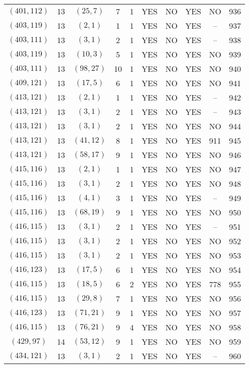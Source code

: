 \begin{longtable}{|c|c|c|c|c|c|c|c|c|c|}
$(401, 112)$ & 13 & $(25, 7)$ & 7 & 1 & YES & NO & YES & NO & 936\\
$(403, 119)$ & 13 & $(2, 1)$ & 1 & 1 & YES & NO & YES & -- & 937\\
$(403, 111)$ & 13 & $(3, 1)$ & 2 & 1 & YES & NO & YES & -- & 938\\
$(403, 119)$ & 13 & $(10, 3)$ & 5 & 1 & YES & NO & YES & NO & 939\\
$(403, 111)$ & 13 & $(98, 27)$ & 10 & 1 & YES & NO & YES & NO & 940\\
$(409, 121)$ & 13 & $(17, 5)$ & 6 & 1 & YES & NO & YES & NO & 941\\
$(413, 121)$ & 13 & $(2, 1)$ & 1 & 1 & YES & NO & YES & -- & 942\\
$(413, 121)$ & 13 & $(3, 1)$ & 2 & 1 & YES & NO & YES & -- & 943\\
$(413, 121)$ & 13 & $(3, 1)$ & 2 & 1 & YES & NO & YES & NO & 944\\
$(413, 121)$ & 13 & $(41, 12)$ & 8 & 1 & YES & NO & YES & 911 & 945\\
$(413, 121)$ & 13 & $(58, 17)$ & 9 & 1 & YES & NO & YES & NO & 946\\
$(415, 116)$ & 13 & $(2, 1)$ & 1 & 1 & YES & NO & YES & NO & 947\\
$(415, 116)$ & 13 & $(3, 1)$ & 2 & 1 & YES & NO & YES & NO & 948\\
$(415, 116)$ & 13 & $(4, 1)$ & 3 & 1 & YES & NO & YES & -- & 949\\
$(415, 116)$ & 13 & $(68, 19)$ & 9 & 1 & YES & NO & YES & NO & 950\\
$(416, 115)$ & 13 & $(3, 1)$ & 2 & 1 & YES & NO & YES & -- & 951\\
$(416, 115)$ & 13 & $(3, 1)$ & 2 & 1 & YES & NO & YES & NO & 952\\
$(416, 115)$ & 13 & $(3, 1)$ & 2 & 1 & YES & NO & YES & NO & 953\\
$(416, 123)$ & 13 & $(17, 5)$ & 6 & 1 & YES & NO & YES & NO & 954\\
$(416, 115)$ & 13 & $(18, 5)$ & 6 & 2 & YES & NO & YES & 778 & 955\\
$(416, 115)$ & 13 & $(29, 8)$ & 7 & 1 & YES & NO & YES & NO & 956\\
$(416, 123)$ & 13 & $(71, 21)$ & 9 & 1 & YES & NO & YES & NO & 957\\
$(416, 115)$ & 13 & $(76, 21)$ & 9 & 4 & YES & NO & YES & NO & 958\\
$(429, 97)$ & 14 & $(53, 12)$ & 9 & 1 & YES & NO & YES & NO & 959\\
$(434, 121)$ & 13 & $(3, 1)$ & 2 & 1 & YES & NO & YES & -- & 960\\

\end{longtable}
